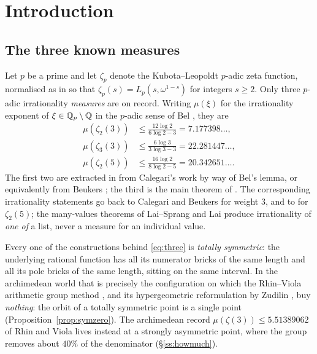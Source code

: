 \section{Introduction}\label{sec:intro}

\subsection{The three known measures}\label{ss:three}

Let $p$ be a prime and let $\zeta_p$ denote the Kubota--Leopoldt $p$-adic zeta function,
normalised as in \cite{LSZ2025} so that $\zeta_p(s)=L_p(s,\omega^{1-s})$ for integers
$s\ge2$. Only three $p$-adic irrationality \emph{measures} are on record. Writing
$\mu(\xi)$ for the irrationality exponent of $\xi\in\mathbb{Q}_p\setminus\mathbb{Q}$ in the $p$-adic sense
of Bel \cite{Bel2019}, they are
\begin{equation}\label{eq:three}
\begin{aligned}
 \mu(\zeta_2(3)) &\le \frac{12\log2}{6\log2-3} = 7.177398\dots,\\
 \mu(\zeta_3(3)) &\le \frac{6\log3}{3\log3-3} = 22.281447\dots,\\
 \mu(\zeta_2(5)) &\le \frac{16\log2}{8\log2-5} = 20.342651\dots .
\end{aligned}
\end{equation}
The first two are extracted in \cite[\S1]{LSZ2025} from Calegari's work \cite{Calegari2005}
by way of Bel's lemma, or equivalently from Beukers \cite[Thm.~11.2]{Beukers2008}; the third
is the main theorem of \cite{LSZ2025}. The corresponding irrationality statements go back to
Calegari \cite{Calegari2005} and Beukers \cite{Beukers2008} for weight $3$, and to
\cite{LSZ2025} for $\zeta_2(5)$; the many-values theorems of Lai--Sprang
\cite{LaiSprang2023} and Lai \cite{Lai2024} produce irrationality of \emph{one of} a list,
never a measure for an individual value.

Every one of the constructions behind \eqref{eq:three} is \emph{totally symmetric}: the
underlying rational function has all its numerator bricks of the same length and all its
pole bricks of the same length, sitting on the same interval. In the archimedean world that
is precisely the configuration on which the Rhin--Viola arithmetic group method
\cite{RhinViola}, and its hypergeometric reformulation by Zudilin \cite{Zudilin2004}, buy
\emph{nothing}: the orbit of a totally symmetric point is a single point
(Proposition~\ref{prop:symzero}). The archimedean record $\mu(\zeta(3))\le5.51389062$ of
Rhin and Viola lives instead at a strongly asymmetric point, where the group removes about
$40\%$ of the denominator (\S\ref{ss:howmuch}).

